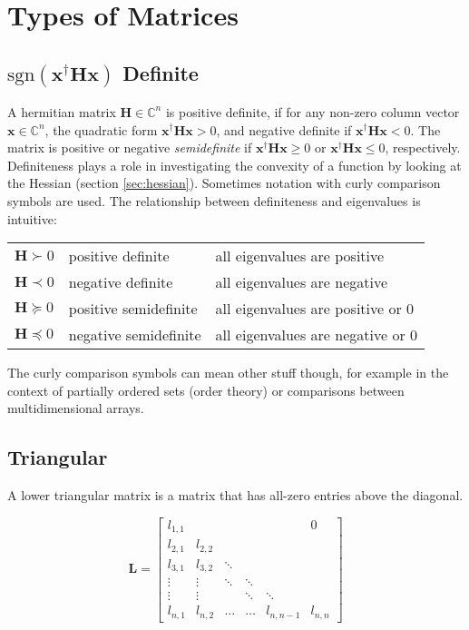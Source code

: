\section{Types of Matrices}

\subsection{$\mathrm{sgn}\left(\mathbf{x}^{\dagger}\mathbf{H}\mathbf{x}\right)$ Definite}
\label{sec:definiteness}

A hermitian matrix $\mathbf{H}\in\mathbb{C}^n$ is positive definite, if for any non-zero column vector $\mathbf{x}\in\mathbb{C}^n$, the quadratic form $\mathbf{x}^{\dagger}\mathbf{H}\mathbf{x} > 0$, and negative definite if $\mathbf{x}^{\dagger}\mathbf{H}\mathbf{x} < 0$. The matrix is positive or negative \textit{semidefinite} if  $\mathbf{x}^{\dagger}\mathbf{H}\mathbf{x} \geq 0$ or $\mathbf{x}^{\dagger}\mathbf{H}\mathbf{x} \leq 0$, respectively. Definiteness plays a role in investigating the convexity of a function by looking at the Hessian (section \ref{sec:hessian}). Sometimes notation with curly comparison symbols are used. The relationship between definiteness and eigenvalues is intuitive:

\begin{tabular}{lll}
$\mathbf{H} \succ 0$ & positive definite & all eigenvalues are positive\\
$\mathbf{H} \prec 0$ & negative definite & all eigenvalues are negative\\
$\mathbf{H} \succeq 0$ & positive semidefinite & all eigenvalues are positive or 0\\
$\mathbf{H} \preceq 0$ & negative semidefinite & all eigenvalues are negative or 0
\centering
\end{tabular}

The curly comparison symbols can mean other stuff though, for example in the context of partially ordered sets (order theory) or comparisons between multidimensional arrays.





\subsection{Triangular}
A lower triangular matrix is a matrix that has all-zero entries above the diagonal.


\begin{equation}
\mathbf{L} = \left[\begin{array}{cccccc} l_{1,1}&&&&&0\\l_{2,1}&l_{2,2}&&&&\\l_{3,1}&l_{3,2}&\ddots&&&\\  \vdots&\vdots&\ddots&\ddots&&\\ \vdots&\vdots&&\ddots&\ddots&\\  l_{n,1}&l_{n,2}&\hdots&\hdots&l_{n,n-1}&l_{n,n}\end{array}\right]
\end{equation}


